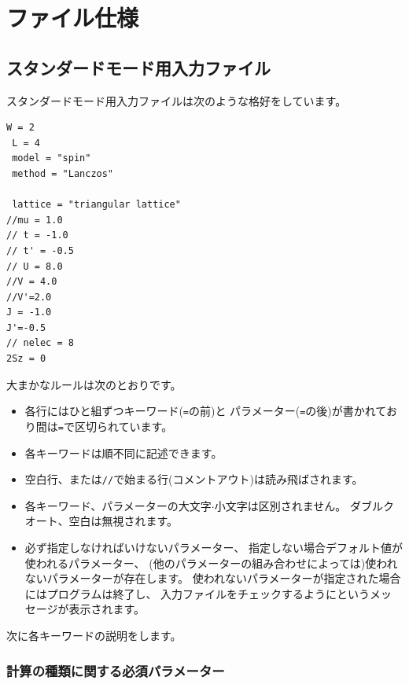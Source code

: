 \chapter{ファイル仕様}

\section{スタンダードモード用入力ファイル}
\label{Ch:HowToStandard}


スタンダードモード用入力ファイルは次のような格好をしています。

\begin{minipage}{10cm}
\begin{screen}
\begin{verbatim}
W = 2
 L = 4
 model = "spin"
 method = "Lanczos"

 lattice = "triangular lattice"
//mu = 1.0
// t = -1.0
// t' = -0.5
// U = 8.0
//V = 4.0
//V'=2.0
J = -1.0
J'=-0.5
// nelec = 8
2Sz = 0
\end{verbatim}
\end{screen}
\end{minipage}

大まかなルールは次のとおりです。
\begin{itemize}
\item 各行にはひと組ずつキーワード(\verb|=|の前)と
  パラメーター(\verb|=|の後)が書かれており間は\verb|=|で区切られています。
\item 各キーワードは順不同に記述できます。
\item 空白行、または\verb|//|で始まる行(コメントアウト)は読み飛ばされます。
\item 各キーワード、パラメーターの大文字$\cdot$小文字は区別されません。
  ダブルクオート、空白は無視されます。
\item 必ず指定しなければいけないパラメーター、
  指定しない場合デフォルト値が使われるパラメーター、
  (他のパラメーターの組み合わせによっては)使われないパラメーターが存在します。
  使われないパラメーターが指定された場合にはプログラムは終了し、
  入力ファイルをチェックするようにというメッセージが表示されます。
\end{itemize}

次に各キーワードの説明をします。

\subsection{計算の種類に関する必須パラメーター}

